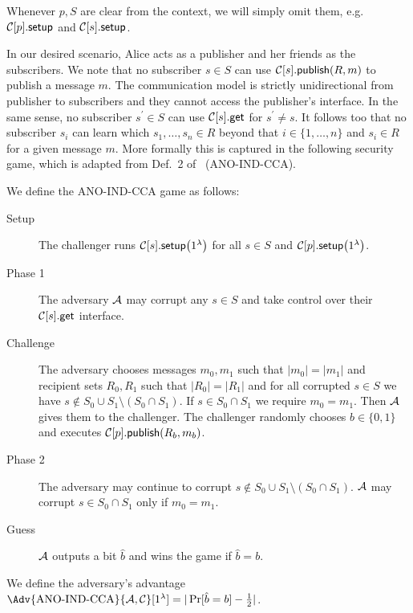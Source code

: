 Whenever \(p, S\) are clear from the context, we will simply omit them, e.g.\ 
\(\csetup{p}\) and \(\csetup{s}\).

In our desired scenario, Alice acts as a publisher and her friends as the 
subscribers.
We note that no subscriber \(s\in S\) can use \(\cpub{s}[R][m]\) to publish 
a message \(m\).
The communication model is strictly unidirectional from publisher to 
subscribers and they cannot access the publisher's interface.
In the same sense, no subscriber \(s^\prime\in S\) can use \(\cget{s}\) for 
\(s^\prime\neq s\).
It follows too that no subscriber \(s_i\) can learn which \(s_1, \ldots, s_n\in 
  R\) beyond that \(i\in \{1, \ldots, n\}\) and \(s_i\in R\) for a given 
message \(m\).
More formally this is captured in the following security game, which is adapted 
from Def.\ 2 of~\cite{ANOBE} (ANO-IND-CCA).

\begin{definition}\label{ANO-IND-CCA}
  We define the ANO-IND-CCA game as follows:
  \begin{description}
    \item[Setup] The challenger runs \(\csetup{s}[1^\lambda]\) for all \(s\in 
        S\) and \(\csetup{p}[1^\lambda]\).
    \item[Phase 1] The adversary \(\A\) may corrupt any \(s\in S\) and take 
      control over their \(\cget{s}\) interface.
    \item[Challenge] The adversary chooses messages \(m_0, m_1\) such that 
      \(|m_0| = |m_1|\) and recipient sets \(R_0, R_1\) such that \(|R_0| 
        = |R_1|\) and for all corrupted \(s\in S\) we have \(s\notin S_0\cup 
        S_1\setminus (S_0\cap S_1)\).
      If \(s\in S_0\cap S_1\) we require \(m_0 = m_1\).
      Then \(\A\) gives them to the challenger.
      The challenger randomly chooses \(b\in \{0, 1\}\) and executes 
      \(\cpub{p}[R_b][m_b]\).
    \item[Phase 2] The adversary may continue to corrupt \(s\notin S_0\cup 
        S_1\setminus (S_0\cap S_1)\).
      \(\A\) may corrupt \(s\in S_0\cap S_1\) only if \(m_0 = m_1\).
    \item[Guess] \(\A\) outputs a bit \(\hat{b}\) and wins the game if 
      \(\hat{b} = b\).
  \end{description}
  We define the adversary's advantage \(\Adv{\text{ANO-IND-CCA}}{\A, 
      \Cop}[1^\lambda] = |\Pr[ \hat{b} = b ] - \frac{1}{2}|\).
\end{definition}


